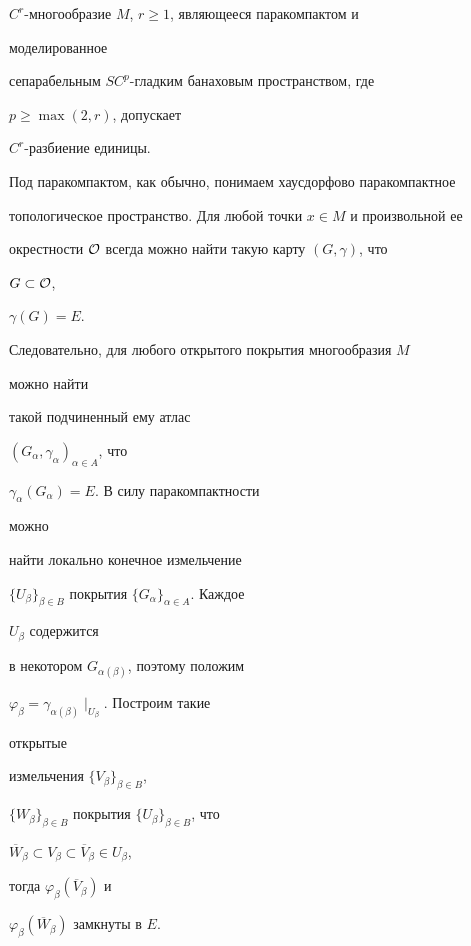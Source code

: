 \begin{thms}


$C^r$-многообразие $M$, $r\ge 1$, являющееся паракомпактом и


моделированное


сепарабельным $SC^p$-гладким банаховым пространством, где


$p\ge\max(2,r)$, допускает


$C^r$-разбиение единицы.


\end{thms}





\begin{pf}


Под паракомпактом, как обычно, понимаем хаусдорфово паракомпактное


топологическое пространство. Для любой точки $x\in M$ и произвольной ее


окрестности $\cal O$ всегда можно найти такую карту $(G,\gamma)$, что


$G\subset\cal O$,


$\gamma(G)=E$.


Следовательно, для любого открытого покрытия многообразия $M$


можно найти


такой подчиненный ему атлас


$(G_\alpha,\gamma_\alpha)_{\alpha\in A}$, что


$\gamma_\alpha(G_\alpha)=E$. В силу паракомпактности


можно


найти локально конечное измельчение


$\{U_\beta\}_{\beta\in B}$ покрытия $\{G_\alpha\}_{\alpha\in A}$. Каждое


$U_\beta$ содержится


в некотором $G_{\alpha(\beta)}$, поэтому положим


$\varphi_\beta=\gamma_{\alpha(\beta)}\mid_{U_\beta}$. Построим такие


открытые


измельчения $\{V_\beta\}_{\beta\in B}$,


$\{W_\beta\}_{\beta\in B}$ покрытия $\{U_\beta\}_{\beta\in B}$, что


$\overline W_\beta\subset V_\beta\subset\overline V_\beta\in U_\beta$,


тогда $\varphi_\beta(\overline V_\beta)$ и


$\varphi_\beta(\overline W_\beta)$ замкнуты в $E$.






\end{pf}
